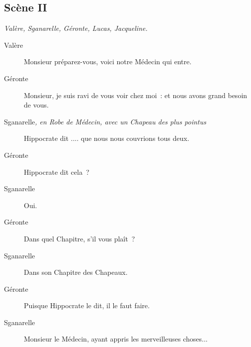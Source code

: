 \documentclass[french,twoside]{book} %
\begin{document}
\subsection[{Scène II}]{Scène II}
\label{II02}
\textit{Valère, Sganarelle, Géronte, Lucas, Jacqueline.}\par
 \begin{description} \item[Valère] 

Monsieur préparez-vous, voici notre Médecin qui entre.\end{description}
 \begin{description} \item[Géronte] 

Monsieur, je suis ravi de vous voir chez moi : et nous avons grand besoin de vous.\end{description}
 \begin{description} \item[Sganarelle\textit{, en Robe de Médecin, avec un Chapeau des plus pointus}\par
] 

Hippocrate dit .... que nous nous couvrions tous deux.\end{description}
 \begin{description} \item[Géronte] 

Hippocrate dit cela ?\end{description}
 \begin{description} \item[Sganarelle] 

Oui.\end{description}
 \begin{description} \item[Géronte] 

Dans quel Chapitre, s’il vous plaît ?\end{description}
 \begin{description} \item[Sganarelle] 

Dans son Chapitre des Chapeaux.\end{description}
 \begin{description} \item[Géronte] 

Puisque Hippocrate le dit, il le faut faire.\end{description}
 \begin{description} \item[Sganarelle] 

Monsieur le Médecin, ayant appris les merveilleuses choses...\end{description}
\end{document}
